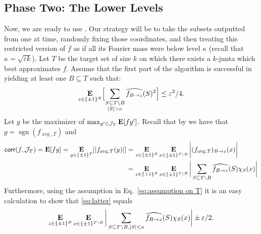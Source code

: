 \documentclass[10pt,a4paper]{article}
\theoremstyle{plain}
\theoremstyle{remark}
\theoremstyle{plain}
\providecommand{\E}{}
\renewcommand{\E}{\mathop{\bf E\/}}
\newcommand{\bigbracket}[1]{\Bigl [ #1 \Bigr ]}
\newcommand{\sgn}{\operatorname{sgn}}
\newcommand{\eps}{\varepsilon}
\renewcommand{\hat}{\widehat}
\newcommand{\pmone}{\{\pm 1\}}
\newcommand{\calJ}{\mathcal{J}}
\newcommand{\avg}{\operatorname{avg}}
\newcommand{\BooleanHypercube}[1]{\{\pm 1\}^{#1}}
\newcommand{\specialset}{T}
\newcommand{\corr}{\mathsf{corr}}
\newcommand{\fourierCutoff}{\kappa}
\renewcommand{\epsilon}{\varepsilon}
\begin{document}
\subsection{Phase Two: The Lower Levels}
\label{subsection:phase-two-lower-levels}

Now, we are ready to use . Our strategy will be to take the subsets outputted from  one at time, randomly fixing those coordinates, and then treating this restricted version of $f$ as if all its Fourier mass were below level $\fourierCutoff$ (recall that $\fourierCutoff = \sqrt{\eps k}$).
Let $T$ be the target set of size $k$ on which there exists a $k$-junta which best approximates $f$.
Assume that the first part of the algorithm is successful in yielding at least one $B\subseteq T$ such that:
\begin{equation}\label{eq:assumption on T}\E_{z \in \pmone^B}\bigbracket{\sum_{\substack{S \subseteq \specialset \setminus B \\ |S| > \fourierCutoff}} \hat{f_{B \to z}}(S)^2} \leq \epsilon^2/4.\end{equation}
Let $g$ be the maximizer of $\max_{g' \in \calJ_T} \E[fg']$. 
Recall that by  we have that
$g = \sgn(f_{\avg,T})$ and 
\begin{align}
    \corr(f, \calJ_T) = \E[fg] = \E_{y \in \BooleanHypercube{T}} [|f_{\avg, T}(y)|]
     &=\E_{z \in \BooleanHypercube{B}} \E_{x \in \BooleanHypercube{T \setminus B}}\bigg | (f_{\avg, T})_{B \to z}(x)\bigg|\\
     &=\E_{z \in \BooleanHypercube{B}} \E_{x \in \BooleanHypercube{T \setminus B}}
     \bigg | \sum_{S \subseteq T\setminus B} \hat{f_{B \to z}}(S)\chi_S(x)\bigg|\label{eq:latter}
     \end{align}
     Furthermore, using the assumption in Eq.~\eqref{eq:assumption on T} it is an easy calculation to show that \eqref{eq:latter} equals
     $$
     \E_{z \in \BooleanHypercube{B}} \E_{x \in \BooleanHypercube{T \setminus B}}
     \bigg | \sum_{S \subseteq T\setminus B, |S|\le \fourierCutoff} \hat{f_{B \to z}}(S)\chi_S(x)\bigg| \pm \eps/2.
     $$
     
\end{document}
